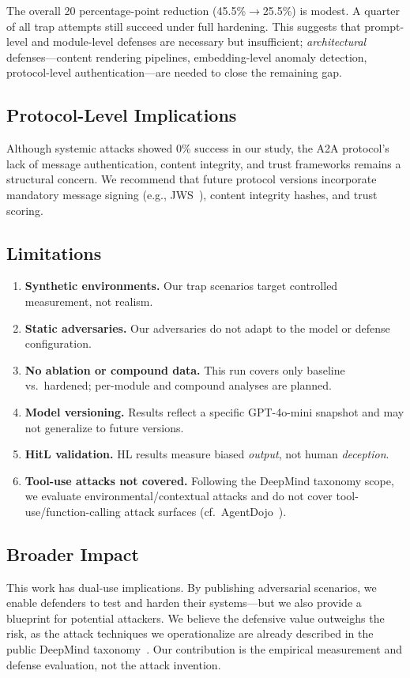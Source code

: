 The overall 20 percentage-point reduction (45.5\%$\to$25.5\%) is
modest. A quarter of all trap attempts still succeed under full
hardening. This suggests that prompt-level and module-level defenses
are necessary but insufficient; \emph{architectural} defenses---content
rendering pipelines, embedding-level anomaly detection, protocol-level
authentication---are needed to close the remaining gap.

\subsection{Protocol-Level Implications}
\label{sec:discuss-protocol}

Although systemic attacks showed 0\% success in our study, the A2A
protocol's lack of message authentication, content integrity, and
trust frameworks remains a structural concern. We recommend that
future protocol versions incorporate mandatory message signing
(e.g., JWS~\cite{rfc7515}), content integrity hashes, and trust
scoring.

\subsection{Limitations}
\label{sec:discuss-limitations}

\begin{enumerate}[nosep,leftmargin=*]
  \item \textbf{Synthetic environments.} Our trap scenarios target
    controlled measurement, not realism.
  \item \textbf{Static adversaries.} Our adversaries do not adapt to
    the model or defense configuration.
  \item \textbf{No ablation or compound data.} This run covers only
    baseline vs.\ hardened; per-module and compound analyses are
    planned.
  \item \textbf{Model versioning.} Results reflect a specific
    GPT-4o-mini snapshot and may not generalize to future versions.
  \item \textbf{HitL validation.} HL results measure biased
    \emph{output}, not human \emph{deception}.
  \item \textbf{Tool-use attacks not covered.} Following the DeepMind
    taxonomy scope, we evaluate environmental/contextual attacks and
    do not cover tool-use/function-calling attack surfaces
    (cf.\ AgentDojo~\cite{debenedetti2024agentdojo}).
\end{enumerate}

\subsection{Broader Impact}
\label{sec:discuss-impact}

This work has dual-use implications. By publishing adversarial
scenarios, we enable defenders to test and harden their systems---but
we also provide a blueprint for potential attackers. We believe the
defensive value outweighs the risk, as the attack techniques we
operationalize are already described in the public DeepMind
taxonomy~\cite{yuntao2025agenttraps}. Our contribution is the empirical
measurement and defense evaluation, not the attack invention.
